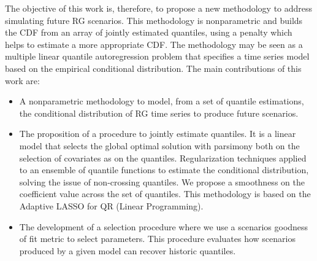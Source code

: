 The objective of this work is, therefore, to propose a new methodology to address simulating future RG scenarios. This methodology is nonparametric and builds the CDF from an array of jointly estimated quantiles, using a penalty which helps to estimate a more appropriate CDF. The methodology may be seen as a multiple linear quantile autoregression problem that specifies a time series model based on the empirical conditional distribution. The main contributions of this work are:
\begin{itemize}
	\item A nonparametric methodology to model, from a set of quantile estimations, the conditional distribution of RG time series to produce future scenarios.
	
	\item The proposition of a procedure to jointly estimate quantiles. It is a linear model that selects the global optimal solution with parsimony both on the selection of covariates as on the quantiles.
	Regularization techniques applied to an ensemble of quantile functions to estimate the conditional distribution, solving the issue of non-crossing quantiles. We propose a smoothness on the coefficient value across the set of quantiles.
	This methodology is based on the Adaptive LASSO for QR (Linear Programming). 
	

	\item   The development of a selection procedure where we use a scenarios goodness of fit metric to select parameters. This procedure evaluates how scenarios produced by a given model  can recover historic quantiles.
	
\end{itemize}




